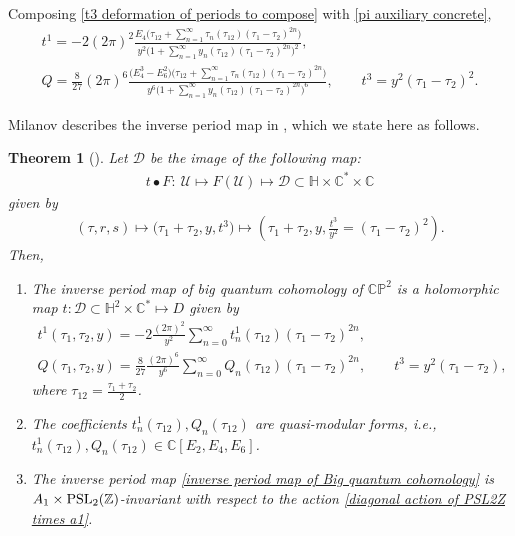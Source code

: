 \documentclass[pdftex]{sigma}
\numberwithin{equation}{section}
\newtheorem{Theorem}{Theorem}[section]
\begin{document}
 Composing \eqref{t3 deformation of periods to compose} with \eqref{pi auxiliary concrete},
\begin{gather*}
t^1=-2 (2\pi )^2\frac{E_4\bigl(\tau_{12}+\sum_{n=1}^{\infty} \tau_{n}(\tau_{12}) (\tau_1-\tau_2)^{2n} \bigr)}{y^2\bigl( 1+\sum_{n=1}^{\infty} y_n(\tau_{12})(\tau_1-\tau_2)^{2n} \bigr)^2},\\
Q=\frac{8}{27}(2\pi)^6 \frac{\bigl(E_4^3-E_6^2\bigr)\bigl(\tau_{12}+\sum_{n=1}^{\infty} \tau_{n}(\tau_{12}) (\tau_1-\tau_2)^{2n} \bigr)}{y^6\bigl( 1+\sum_{n=1}^{\infty} y_n(\tau_{12})(\tau_1-\tau_2)^{2n} \bigr)^6},\qquad
t^3=y^2(\tau_1-\tau_2)^2.
\end{gather*}

 Milanov describes the inverse period map in \cite[Theorem 2.4]{Milanov}, which we state here as follows.

\begin{Theorem}[{\cite{Milanov}}]
Let $\mathcal{D}$ be the image of the following map:
\begin{gather*}
 t\bullet F\colon\ \mathcal{U}\mapsto F(\mathcal{U})\mapsto \mathcal{D}\subset \mathbb{H}\times\mathbb{C}^{*}\times\mathbb{C}
\end{gather*}
given by
\begin{gather*}
(\tau,r,s)\mapsto \bigl(\tau_1+\tau_2,y,t^3\bigr)\mapsto \left(\tau_1+\tau_2,y,\frac{t^3}{y^2}=(\tau_1-\tau_2)^2\right).
\end{gather*}
Then,
\begin{enumerate}\itemsep=0pt
\item[$(1)$]
The inverse period map of big quantum cohomology of $\mathbb{CP}^2$ is a holomorphic map $t\colon \mathcal{D}\subset \mathbb{H}^2\times \mathbb{C}^{*} \mapsto D$
given by
\begin{gather}
t^1(\tau_1,\tau_2,y)=-2\frac{ (2\pi )^2}{y^2}\sum_{n=0}^{\infty} t^1_n(\tau_{12})(\tau_1-\tau_2)^{2n} ,\nonumber\\
Q(\tau_1,\tau_2,y)=\frac{8}{27}\frac{(2\pi)^6 }{y^6}\sum_{n=0}^{\infty} Q_n(\tau_{12})(\tau_1-\tau_2)^{2n},\qquad
t^3=y^2(\tau_1-\tau_2),\label{inverse period map of Big quantum cohomology}
\end{gather}
where $\tau_{12}=\frac{\tau_1+\tau_2}{2}$.
\item[$(2)$]
The coefficients $t^1_n(\tau_{12}), Q_n(\tau_{12})$ are quasi-modular forms, i.e.,
$
t^1_n(\tau_{12}), Q_n(\tau_{12})\in \mathbb{C}[E_2,\allowbreak E_4,E_6]$.
\item[$(3)$] The inverse period map \eqref{inverse period map of Big quantum cohomology} is $A_1\times {\rm PSL}_2(\mathbb{Z})$-invariant with respect to the action \eqref{diagonal action of PSL2Z times a1}.

\end{enumerate}

\end{Theorem}
\end{document}
